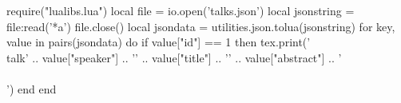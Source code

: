 \documentclass[a3paper]{article}
\begin{document}

\begin{luacode}
require("lualibs.lua")
local file = io.open('talks.json')
local jsonstring = file:read('*a')
file.close()
local jsondata =  utilities.json.tolua(jsonstring)
for key, value in pairs(jsondata) do
  if value["id"] == 1 then 
      tex.print('\\talk{' .. 
        value["speaker"]  .. 
        '}{'              .. 
        value["title"]    .. 
        '}{'              .. 
        value["abstract"] .. 
        '}\\\\[1em]')
  end
end
\end{luacode}
 
\end{document}
